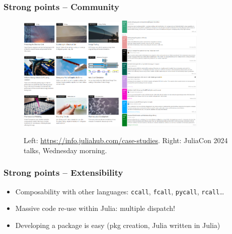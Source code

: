 \documentclass{beamer}
\begin{document}
\begin{frame}
    \frametitle{Strong points -- Community}
    \begin{figure}[htbp]
        \centering
        \includegraphics[width=0.45\textwidth]{julia_case_studies.png}
        \includegraphics[width=0.35\textwidth]{juliacon_talks.png}
        \caption{Left: \url{https://info.juliahub.com/case-studies}. Right: JuliaCon 2024 talks, Wednesday morning.}
        \label{fig:julia_use}
    \end{figure}
\end{frame}


\begin{frame}
    \frametitle{Strong points -- Extensibility}
    \begin{itemize}
        \item Composability with other languages: {\tt ccall}, {\tt fcall}, {\tt pycall}, {\tt rcall}\dots
        \item Massive code re-use within Julia: multiple dispatch!
        \item Developing a package is easy (pkg creation, Julia written in Julia)
    \end{itemize}
\end{frame}
\end{document}
